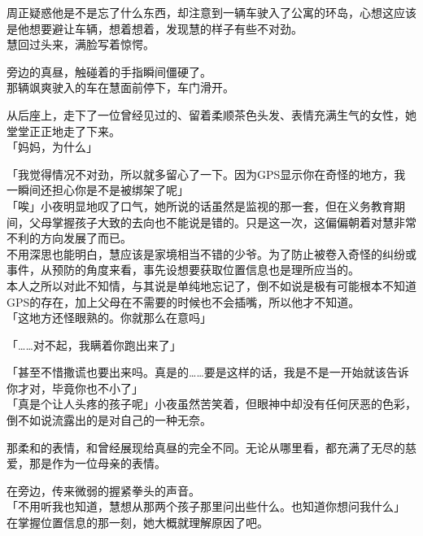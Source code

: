 周正疑惑他是不是忘了什么东西，却注意到一辆车驶入了公寓的环岛，心想这应该是他想要避让车辆，想着想着，发现慧的样子有些不对劲。\\

慧回过头来，满脸写着惊愕。

旁边的真昼，触碰着的手指瞬间僵硬了。\\

那辆飒爽驶入的车在慧面前停下，车门滑开。

从后座上，走下了一位曾经见过的、留着柔顺茶色头发、表情充满生气的女性，她堂堂正正地走了下来。\\

「妈妈，为什么」

「我觉得情况不对劲，所以就多留心了一下。因为GPS显示你在奇怪的地方，我一瞬间还担心你是不是被绑架了呢」\\

「唉」小夜明显地叹了口气，她所说的话虽然是监视的那一套，但在义务教育期间，父母掌握孩子大致的去向也不能说是错的。只是这一次，这偏偏朝着对慧非常不利的方向发展了而已。\\

不用深思也能明白，慧应该是家境相当不错的少爷。为了防止被卷入奇怪的纠纷或事件，从预防的角度来看，事先设想要获取位置信息也是理所应当的。\\

本人之所以对此不知情，与其说是单纯地忘记了，倒不如说是极有可能根本不知道GPS的存在，加上父母在不需要的时候也不会插嘴，所以他才不知道。\\

「这地方还怪眼熟的。你就那么在意吗」

「……对不起，我瞒着你跑出来了」

「甚至不惜撒谎也要出来吗。真是的……要是这样的话，我是不是一开始就该告诉你才对，毕竟你也不小了」\\

「真是个让人头疼的孩子呢」小夜虽然苦笑着，但眼神中却没有任何厌恶的色彩，倒不如说流露出的是对自己的一种无奈。

那柔和的表情，和曾经展现给真昼的完全不同。无论从哪里看，都充满了无尽的慈爱，那是作为一位母亲的表情。

在旁边，传来微弱的握紧拳头的声音。\\

「不用听我也知道，慧想从那两个孩子那里问出些什么。也知道你想问我什么」\\

在掌握位置信息的那一刻，她大概就理解原因了吧。\\

